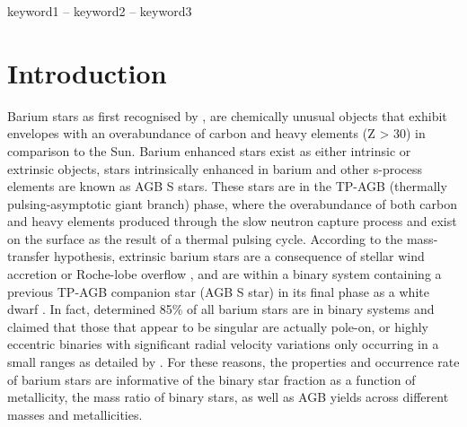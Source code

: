 \documentclass[a4paper,fleqn,usenatbib]{mnras}
\begin{document}
\begin{keywords}
keyword1 -- keyword2 -- keyword3
\end{keywords}

\section{Introduction} \label{sec:intro}

Barium stars as first recognised by \citet{Bidelman1951}, are chemically unusual objects that exhibit envelopes with an overabundance of carbon and heavy elements (Z > 30) in comparison to the Sun. Barium enhanced stars exist as either intrinsic or extrinsic objects, stars intrinsically enhanced in barium and other s-process elements are known as AGB S stars. These stars are in the TP-AGB (thermally pulsing-asymptotic giant branch) phase, where the overabundance of both carbon and heavy elements produced through the slow neutron capture process and exist on the surface as the result of a thermal pulsing cycle. According to the mass-transfer hypothesis, extrinsic barium stars are a consequence of stellar wind accretion \citep{boffin1988,jorissen1992} or Roche-lobe overflow \citep{webbink1986}, and are within a binary system containing a previous TP-AGB companion star (AGB S star) in its final phase as a white dwarf \citep{bohm1980,bohm1984}. In fact, \citet{mcclure1983} determined 85\% of all barium stars are in binary systems and claimed that those that appear to be singular are actually pole-on, or highly eccentric binaries with significant radial velocity variations only occurring in a small ranges as detailed by \citet{pourbaix2004}. For these reasons, the properties and occurrence rate of barium stars are informative of the binary star fraction as a function of metallicity, the mass ratio of binary stars, as well as AGB yields across different masses and metallicities. 
\end{document}
